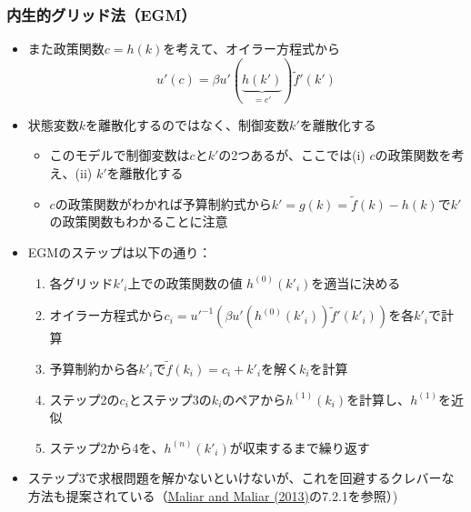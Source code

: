 \documentclass[unicode,9pt]{beamer}%
\begin{document}
\begin{frame}\frametitle{内生的グリッド法（EGM）}
  \begin{itemize}
    \item また政策関数$c = h(k)$を考えて、オイラー方程式から
      $$
      u'(c) = \beta u'(\underbrace{h(k')}_{=c'}) \tilde{f}'(k')
      $$
    \item 状態変数$k$を離散化するのではなく、制御変数$k'$を離散化する
      \begin{itemize}
        \item このモデルで制御変数は$c$と$k'$の2つあるが、ここでは(i) $c$の政策関数を考え、(ii) $k'$を離散化する
        \item $c$の政策関数がわかれば予算制約式から$k' = g(k) = \tilde{f}(k) - h(k)$で$k'$の政策関数もわかることに注意
      \end{itemize}
      \item EGMのステップは以下の通り：
        \begin{enumerate}
          \item 各グリッド$k'_i$上での政策関数の値 $h^{(0)}(k'_i)$を適当に決める
          \item オイラー方程式から$c_i = u'^{-1} \left( \beta u'(h^{(0)}(k'_i)) \tilde{f}' (k'_i) \right)$を各$k'_i$で計算
          \item 予算制約から各$k'_i$で$\tilde{f}(k_i) = c_i + k'_i$を解く$k_i$を計算
          \item ステップ2の$c_i$とステップ3の$k_i$のペアから$h^{(1)}(k_i)$を計算し、$h^{(1)}$を近似
          \item ステップ2から4を、$h^{(n)}(k'_i)$が収束するまで繰り返す
        \end{enumerate}
      \item ステップ3で求根問題を解かないといけないが、これを回避するクレバーな方法も提案されている（\href{https://stanford.edu/~maliars/Files/Chapter7HandbookCE2014.pdf}{Maliar and Maliar (2013)}の7.2.1を参照）)
  \end{itemize}
\end{frame}
\end{document}
